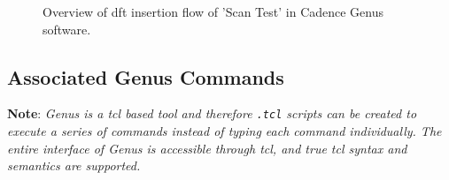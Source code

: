 \documentclass[a4paper,11pt]{article}%
\begin{document}
\begin{figure}[h]
	\centering
	\caption{Overview of \ac{dft} insertion flow of 'Scan Test' in Cadence Genus software.}
	\label{fig:dftinsertion}
\end{figure}

\pagebreak
\subsection{Associated Genus Commands}

\textbf{Note}: \textit{Genus is a \ac{tcl} based tool and therefore {\tt .tcl} scripts can be created to execute a series of commands instead of typing each command individually. The entire interface of Genus is accessible through \ac{tcl}, and true \ac{tcl} syntax and semantics are supported.}\\
\end{document}
